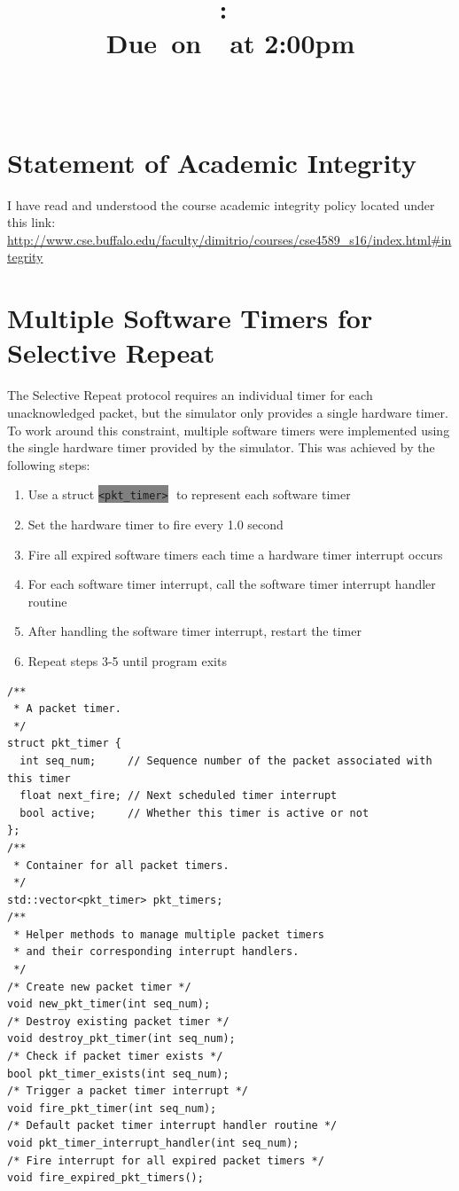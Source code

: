 \documentclass{article}
\title{
    \vspace{2in}
    \textmd{\textbf{\hmwkClass:\ \hmwkTitle}}\\
    \normalsize\vspace{0.1in}\small{Due\ on\ \hmwkDueDate\ at 2:00pm}\\
    \vspace{0.1in}\large{\textit{\hmwkClassInstructor\ \hmwkClassTime}}
    \vspace{3in}}
\author{\textbf{\hmwkAuthorName}}
\date{}
\begin{document}
\maketitle

\pagebreak

\section{Statement of Academic Integrity}
I have read and understood the course academic integrity policy located under this link:
\url{http://www.cse.buffalo.edu/faculty/dimitrio/courses/cse4589_s16/index.html\#integrity}

\section{Multiple Software Timers for Selective Repeat}
The Selective Repeat protocol requires an individual timer for each unacknowledged packet, but the simulator only provides a single hardware timer. To work around this constraint,
multiple software timers were implemented using the single hardware timer provided by the simulator. This was achieved by the following steps:
\begin{enumerate}
	\item Use a struct \colorbox{gray}{\lstinline[basicstyle=\ttfamily\color{white}]|<pkt_timer>|}  to represent each software timer
	\item Set the hardware timer to fire every 1.0 second
	\item Fire all expired software timers each time a hardware timer interrupt occurs
	\item For each software timer interrupt, call the software timer interrupt handler routine
	\item After handling the software timer interrupt, restart the timer
	\item Repeat steps 3-5 until program exits
\end{enumerate}
\begin{lstlisting}[frame=single]
/**
 * A packet timer.
 */
struct pkt_timer {
  int seq_num;     // Sequence number of the packet associated with this timer
  float next_fire; // Next scheduled timer interrupt
  bool active;     // Whether this timer is active or not
};
/**
 * Container for all packet timers.
 */
std::vector<pkt_timer> pkt_timers;
/**
 * Helper methods to manage multiple packet timers
 * and their corresponding interrupt handlers.
 */
/* Create new packet timer */
void new_pkt_timer(int seq_num);
/* Destroy existing packet timer */
void destroy_pkt_timer(int seq_num);
/* Check if packet timer exists */
bool pkt_timer_exists(int seq_num);
/* Trigger a packet timer interrupt */
void fire_pkt_timer(int seq_num);
/* Default packet timer interrupt handler routine */
void pkt_timer_interrupt_handler(int seq_num);
/* Fire interrupt for all expired packet timers */
void fire_expired_pkt_timers();
\end{lstlisting}
\end{document}
